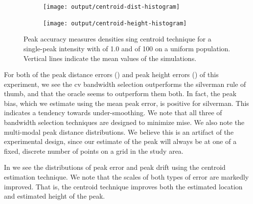 \begin{figure}[htbp]
    \centering
    \begin{subfigure}[b]{0.45\textwidth}
        \texttt{[image: output/centroid-dist-histogram]}
    \end{subfigure}
    \begin{subfigure}[b]{0.45\textwidth}
        \texttt{[image: output/centroid-height-histogram]}
    \end{subfigure}
    \caption[Centroid accuracy: Single-peak of 100 on uniform population]{Peak accuracy measures densities sing centroid technique for a single-peak intensity with  of 1.0 and  of 100 on a uniform population. Vertical lines indicate the mean values of the simulations.}
    \label{fig:centroids:unif_100_1.0_1h}
\end{figure}

For both of the peak distance errors () and peak height errors () of this experiment,
we see the \gls{cv} bandwidth selection outperforms the \gls{silverman} rule of thumb, and that the \gls{oracle} seems to outperform them both.
In fact, the \gls{peak bias}, which we estimate using the mean \gls{peak error},
is positive for \gls{silverman}.
This indicates a tendency towards under-smoothing.
We note that all three of bandwidth selection techniques are designed to minimize \gls{mise}.
We also note the multi-modal peak distance distributions.
We believe this is an artifact of the experimental design,
since our estimate of the peak will always be at one of a fixed, discrete number of points on a grid in the study area.

In  we see the distributions of \gls{peak error} and \gls{peak drift} using the centroid estimation technique.
We note that the scales of both types of error are markedly improved.
That is, the centroid technique improves both the estimated location and estimated height of the peak.

